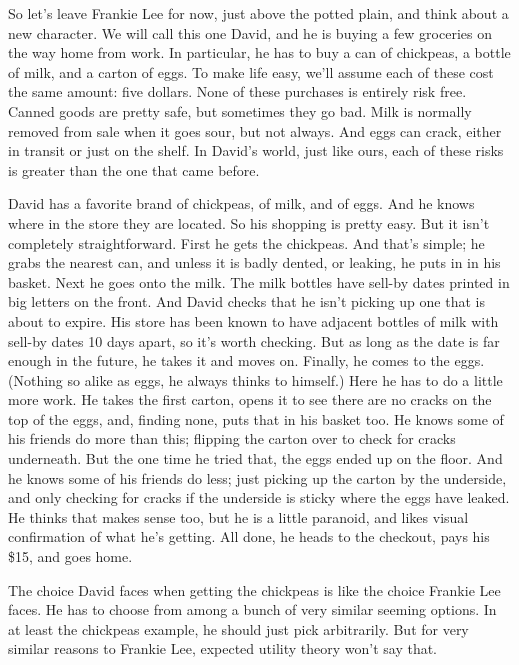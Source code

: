 \documentclass[
  11pt,
  letterpaper,
  DIV=11,
  numbers=noendperiod,
  oneside]{scrartcl}
\begin{document}
So let's leave Frankie Lee for now, just above the potted plain, and
think about a new character. We will call this one David, and he is
buying a few groceries on the way home from work. In particular, he has
to buy a can of chickpeas, a bottle of milk, and a carton of eggs. To
make life easy, we'll assume each of these cost the same amount: five
dollars. None of these purchases is entirely
risk free. Canned goods are pretty safe, but sometimes they go bad. Milk
is normally removed from sale when it goes sour, but not always. And
eggs can crack, either in transit or just on the shelf. In David's
world, just like ours, each of these risks is greater than the one that
came before.

David has a favorite brand of chickpeas, of milk, and of eggs. And he
knows where in the store they are located. So his shopping is pretty
easy. But it isn't completely straightforward. First he gets the
chickpeas. And that's simple; he grabs the nearest can, and unless it is
badly dented, or leaking, he puts in in his basket. Next he goes onto
the milk. The milk bottles have sell-by dates printed in big letters on
the front. And David checks that he isn't picking up one that is about
to expire. His store has been known to have adjacent bottles of milk
with sell-by dates 10 days apart, so it's worth checking. But as long as
the date is far enough in the future, he takes it and moves on. Finally,
he comes to the eggs. (Nothing so alike as eggs, he always thinks to
himself.) Here he has to do a little more work. He takes the first
carton, opens it to see there are no cracks on the top of the eggs, and,
finding none, puts that in his basket too. He knows some of his friends
do more than this; flipping the carton over to check for cracks
underneath. But the one time he tried that, the eggs ended up on the
floor. And he knows some of his friends do less; just picking up the
carton by the underside, and only checking for cracks if the underside
is sticky where the eggs have leaked. He thinks that makes sense too,
but he is a little paranoid, and likes visual confirmation of what he's
getting. All done, he heads to the checkout, pays his \$15, and goes
home.

The choice David faces when getting the chickpeas is like the choice
Frankie Lee faces. He has to choose from among a bunch of very similar
seeming options. In at least the chickpeas example, he should just pick
arbitrarily. But for very similar reasons to Frankie Lee, expected
utility theory won't say that.
\end{document}
